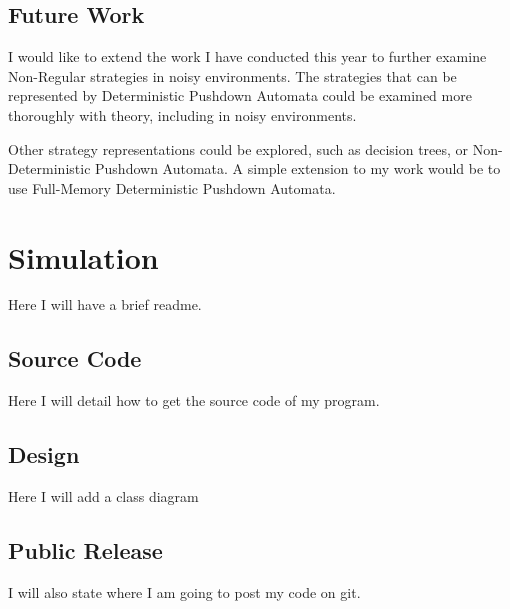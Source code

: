 \documentclass[a4paper,11pt,bcshonoursthesis,singlespace,oneside,thesisdraft,pdflatex]{cssethesis}
\begin{document}
\section{Future Work}
I would like to extend the work I have conducted this year to further examine Non-Regular strategies in noisy environments. 
The strategies that can be represented by Deterministic Pushdown Automata could be examined more thoroughly with theory, including in noisy environments. 

Other strategy representations could be explored, such as decision trees, or Non-Deterministic Pushdown Automata. 
A simple extension to my work would be to use Full-Memory Deterministic Pushdown Automata.
\appendix %

\chapter{Simulation}
Here I will have a brief readme.
\section{Source Code}
\label{app:code}
Here I will detail how to get the source code of my program. 
\section{Design}
Here I will add a class diagram
\section{Public Release}
I will also state where I am going to post my code on git.





\end{document}
